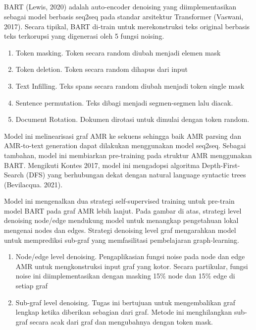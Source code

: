 \subsection{ }

BART (Lewis, 2020) adalah auto-encoder denoising yang diimplementasikan sebagai model berbasis seq2seq pada standar arsitektur Transformer (Vaswani, 2017).
Secara tipikal, BART di-train untuk merekonstruksi teks original berbasis teks terkorupsi yang digenerasi oleh 5 fungsi noising.

\begin{enumerate}
  \item Token masking.
  Token secara random diubah menjadi elemen mask
  \item Token deletion.
  Token secara random dihapus dari input
  \item Text Infilling.
  Teks spans secara random diubah menjadi token single mask
  \item Sentence permutation.
  Teks dibagi menjadi segmen-segmen lalu diacak.
  \item Document Rotation.
  Dokumen dirotasi untuk dimulai dengan token random.
\end{enumerate}

Model ini melinearisasi graf AMR ke sekuens sehingga baik AMR parsing dan AMR-to-text generation dapat dilakukan menggunakan model seq2seq.
Sebagai tambahan, model ini membiarkan pre-training pada struktur AMR menggunakan BART.
Mengikuti Kontes 2017, model ini mengadopsi algoritma Depth-First-Search (DFS) yang berhubungan dekat dengan natural language syntactic trees (Bevilacqua.
2021).

Model ini mengenalkan dua strategi self-supervised training untuk pre-train model BART pada graf AMR lebih lanjut.
Pada gambar di atas, strategi level denoising node/edge mendukung model untuk menangkap pengetahuan lokal mengenai nodes dan edges.
Strategi denoising level graf mengarahkan model untuk memprediksi sub-graf yang memfasilitasi pembelajaran graph-learning.

\begin{enumerate}
  \item Node/edge level denoising.
  Pengaplikasian fungsi noise pada node dan edge AMR untuk mengkonstruksi input graf yang kotor.
  Secara partikular, fungsi noise ini diimplementasikan dengan masking 15\% node dan 15\% edge di setiap graf

  \item Sub-graf level denoising.
  Tugas ini bertujuan untuk mengembalikan graf lengkap ketika diberikan sebagian dari graf.
  Metode ini menghilangkan sub-graf secara acak dari graf dan mengubahnya dengan token mask.
\end{enumerate}

